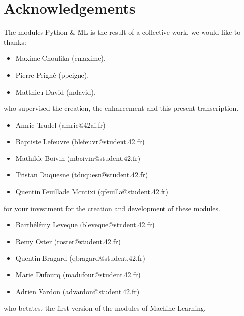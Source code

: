 \documentclass{42-en}
\begin{document}
\section*{Acknowledgements}
The modules Python \& ML is the result of a collective work, we would like to thanks:
\begin{itemize}
  \item Maxime Choulika (cmaxime),
  \item Pierre Peigné (ppeigne),
  \item Matthieu David (mdavid).
\end{itemize}
who supervised the creation, the enhancement and this present transcription.

\begin{itemize}
    \item Amric Trudel (amric@42ai.fr)
    \item Baptiste Lefeuvre (blefeuvr@student.42.fr)
    \item Mathilde Boivin (mboivin@student.42.fr)
    \item Tristan Duquesne (tduquesn@student.42.fr)
    \item Quentin Feuillade Montixi (qfeuilla@student.42.fr)
\end{itemize}
for your investment for the creation and development of these modules.

\begin{itemize}
    \item Barthélémy Leveque (bleveque@student.42.fr)
    \item Remy Oster (roster@student.42.fr)
    \item Quentin Bragard (qbragard@student.42.fr)
    \item Marie Dufourq (madufour@student.42.fr)
    \item Adrien Vardon (advardon@student.42.fr)
\end{itemize}
who betatest the first version of the modules of Machine Learning.
\vfill
\doclicenseThis
\end{document}
